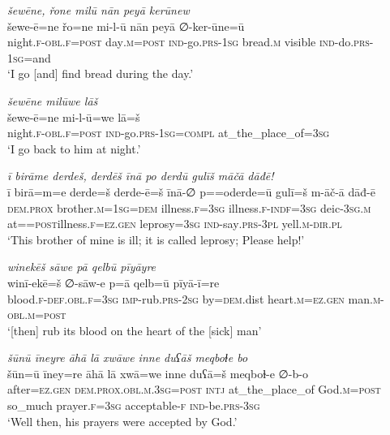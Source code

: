 \ea \label{DG.40}
\textit{šewēne, řone milū nān peyā kerūnew} \\ 
\gll šewe-ē=ne řo=ne mi-l-ū nān peyā ∅-ker-ūne=ū \\ 
 night\textsc{\textsc{.f}}\textsc{-obl}\textsc{\textsc{.f}}\textsc{=\textsc{post}} day\textsc{.m}\textsc{=\textsc{post}} \textsc{ind-}go\textsc{.prs}\textsc{-1sg} bread\textsc{.m} visible \textsc{ind-}do\textsc{.prs}\textsc{-1sg}=and \\ 
\glt `I go [and] find bread during the day.'
\z 
 
\ea \label{DG.41}
\textit{šewēne milūwe lāš} \\ 
\gll šewe-ē=ne mi-l-ū=we lā=š \\ 
 night\textsc{\textsc{.f}}\textsc{-obl}\textsc{\textsc{.f}}\textsc{=\textsc{post}} \textsc{ind-}go\textsc{.prs}\textsc{-1sg}\textsc{=compl} at\_the\_place\_of\textsc{=3sg} \\ 
\glt `I go back to him at night.'
\z 
 
\ea \label{DG.43}
\textit{ī birāme derdeš, derdēš īnā po derdū gulīš māčā dāđē!} \\ 
\gll ī birā=m=e derde=š derde-ē=š īnā-∅ p==oderde=ū gulī=š m-āč-ā dāđ-ē \\ 
 \textsc{dem.prox} brother\textsc{.m}\textsc{=1sg}\textsc{=dem} illness\textsc{\textsc{.f}}\textsc{=3sg} illness\textsc{\textsc{.f}}\textsc{-indf}\textsc{=3sg} deic\textsc{-3sg}\textsc{.m} at=\textsc{=\textsc{post}}illness\textsc{\textsc{.f}}\textsc{=ez}\textsc{.gen} leprosy\textsc{=3sg} \textsc{ind-}say\textsc{.prs}\textsc{-3pl} yell\textsc{.m}\textsc{-dir}\textsc{.pl} \\ 
\glt `This brother of mine is ill; it is called leprosy; Please help!'
\z 
 
\ea \label{DG.50}
\textit{winekēš sāwe pā qelbū pīyāyre} \\ 
\gll winī-ekē=š ∅-sāw-e p=ā qelb=ū pīyā-ī=re \\ 
 blood\textsc{\textsc{.f}}\textsc{-def}\textsc{.obl}\textsc{\textsc{.f}}\textsc{=3sg} \textsc{imp-}rub\textsc{.prs}-\textsc{2sg} by\textsc{=dem}.dist heart\textsc{.m}\textsc{=ez}\textsc{.gen} man\textsc{.m}\textsc{-obl}\textsc{.m}\textsc{=\textsc{post}} \\ 
\glt `[then] rub its blood on the heart of the [sick] man'
\z 
 
\ea \label{DG.60}
\textit{šūnū īneyre āhā lā xwāwe inne duʕāš meqboɫe bo} \\ 
\gll šūn=ū īney=re āhā lā xwā=we inne duʕā=š meqboɫ-e ∅-b-o \\ 
 after\textsc{=ez}\textsc{.gen} \textsc{dem.prox}\textsc{.obl}\textsc{.m}\textsc{.3sg}\textsc{=\textsc{post}} \textsc{intj} at\_the\_place\_of God\textsc{.m}\textsc{=\textsc{post}} so\_much prayer\textsc{\textsc{.f}}\textsc{=3sg} acceptable\textsc{-f} \textsc{ind-}be\textsc{.prs}\textsc{-3sg} \\ 
\glt `Well then, his prayers were accepted by God.'
\z 
 
